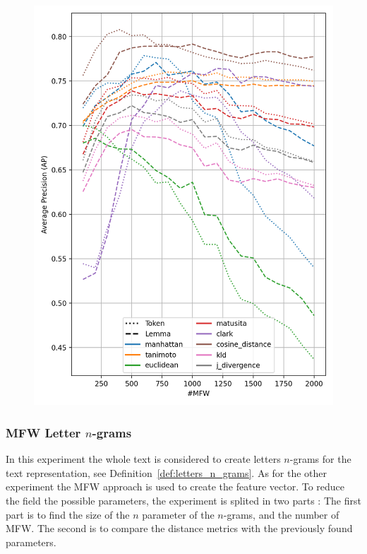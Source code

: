 \begin{figure}
  \label{fig:token_vs_lemma_st_jean}
  \includegraphics[width=0.9\linewidth]{img/token_vs_lemma_st_jean.png}
\end{figure}

\subsubsection{MFW Letter $n$-grams}

In this experiment the whole text is considered to create letters $n$-grams for the text representation, see Definition~\ref{def:letters_n_grams}.
As for the other experiment the MFW approach is used to create the feature vector.
To reduce the field the possible parameters, the experiment is splited in two parts :
The first part is to find the size of the $n$ parameter of the $n$-grams, and the number of MFW. The second is to compare the distance metrics with the previously found parameters.

